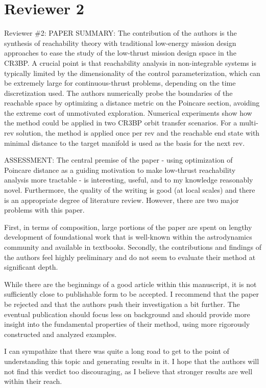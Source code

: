 \documentclass[11pt]{article}
\begin{document}
\section*{Reviewer 2}


Reviewer \#2: PAPER SUMMARY:
The contribution of the authors is the synthesis of reachability theory with traditional low-energy mission design approaches to ease the study of the low-thrust mission design space in the CR3BP.  A crucial point is that reachability analysis in non-integrable systems is typically limited by the dimensionality of the control parameterization, which can be extremely large for continuous-thrust problems, depending on the time discretization used.  The authors numerically probe the boundaries of the reachable space by optimizing a distance metric on the Poincare section, avoiding the extreme cost of unmotivated exploration.  Numerical experiments show how the method could be applied in two CR3BP orbit transfer scenarios.  For a multi-rev solution, the method is applied once per rev and the reachable end state with minimal distance to the target manifold is used as the basis for the next rev.


ASSESSMENT:
The central premise of the paper - using optimization of Poincare distance as a guiding motivation to make low-thrust reachability analysis more tractable - is interesting, useful, and to my knowledge reasonably novel.  Furthermore, the quality of the writing is good (at local scales) and there is an appropriate degree of literature review.  However, there are two major problems with this paper.

First, in terms of composition, large portions of the paper are spent on lengthy development of foundational work that is well-known within the astrodynamics community and available in textbooks. Secondly, the contributions and findings of the authors feel highly preliminary and do not seem to evaluate their method at significant depth.

While there are the beginnings of a good article within this manuscript, it is not sufficiently close to publishable form to be accepted.  I recommend that the paper be rejected and that the authors push their investigation a bit further.  The eventual publication should focus less on background and should provide more insight into the fundamental properties of their method, using more rigorously constructed and analyzed examples.

I can sympathize that there was quite a long road to get to the point of understanding this topic and generating results in it. I hope that the authors will not find this verdict too discouraging, as I believe that stronger results are well within their reach.
\end{document}
